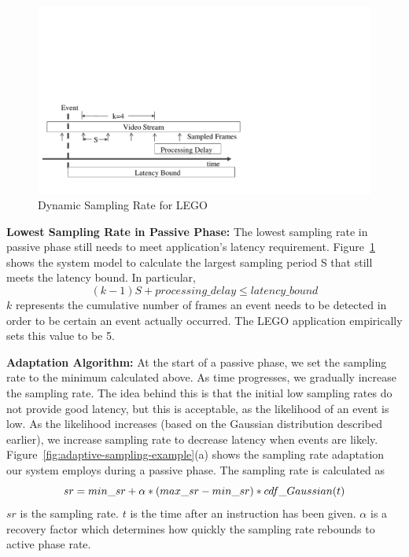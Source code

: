 \begin{figure}[]
\centering
\includegraphics[width=0.95\linewidth,trim=2em 3em 28em 20em, clip]{FIGS/fig-lego-sampling-model.pdf}
\caption{\small Dynamic Sampling Rate for LEGO}
\label{fig:lego-sampling-model}
\end{figure}

\textbf{Lowest Sampling Rate in Passive Phase: }
The lowest sampling rate in passive phase still needs to meet application's
latency requirement. Figure~\ref{fig:lego-sampling-model} shows the system model
to calculate the largest sampling period S that still meets the latency bound.
In particular,
$$(k-1)S + processing\_delay \leq latency\_bound $$ $k$ represents the
cumulative number of frames an event needs to be detected in order to be
certain an event actually occurred. The LEGO application empirically sets this
value to be 5. 

\textbf{Adaptation Algorithm: }
At the start of a passive phase, we set the sampling rate to the
minimum calculated above.  As time progresses, we gradually increase
the sampling rate.  The idea behind this is that the initial low
sampling rates do not provide good latency, but this is acceptable, as
the likelihood of an event is low.  As the likelihood increases (based
on the Gaussian distribution described earlier), we increase sampling
rate to decrease latency when events are likely.
Figure~\ref{fig:adaptive-sampling-example}(a) shows the sampling rate
adaptation our system employs during a passive phase.
The sampling rate is calculated as $$sr = \\
%
 min\_sr + \alpha * (max\_sr - min\_sr) * cdf\_Gaussian(t)$$ 
%
$sr$ is the sampling rate. $t$ is the time after an instruction has been given. $\alpha$ is
a recovery factor which determines how quickly the sampling rate
rebounds to active phase rate. 
 
